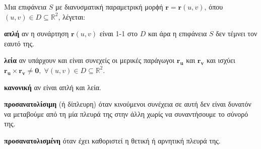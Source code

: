 \documentclass[a4paper,table]{report}
\begin{document}
\begin{dfn}
  Μια επιφάνεια $S$ με διανυσματική παραμετρική μορϕή 
  $ \mathbf{r} =  \mathbf{r}(u,v) $, όπου $ (u,v) \in D \subseteq 
  \mathbb{R}^{2} $, λέγεται:
  \begin{myitemize}
    \item \textbf{απλή} αν η συνάρτηση $ \mathbf{r}(u,v) $ είναι 1-1 στο $D$ και άρα
      η επιφάνεια $S$ δεν τέμνει τον εαυτό της.
    \item \textbf{λεία} αν υπάρχουν και είναι συνεχείς οι μερικές παράγωγοι 
      $ \mathbf{r_{u}}$ και $ \mathbf{r_{v}} $ και ισχύει 
      $ \mathbf{r_{u}} \times \mathbf{r_{v}} \neq \mathbf{0}, \; \forall (u,v) 
      \in D \subseteq \mathbb{R}^{2} $.
    \item \textbf{κανονική} αν είναι απλή και λεία. 
    \item \textbf{προσανατολίσιμη} (ή δίπλευρη) όταν κινούμενοι συνέχεια σε αυτή δεν 
      είναι δυνατόν να μεταβούμε από τη μία πλευρά της στην άλλη χωρίς να συναντήσουμε 
      το σύνορό της.
    \item \textbf{προσανατολισμένη} όταν έχει καθοριστεί η θετική ή αρνητική πλευρά της.
  \end{myitemize}
\end{dfn}
\end{document}
